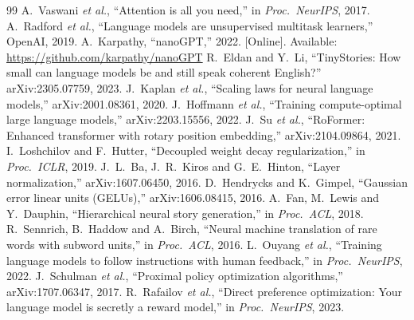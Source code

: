 \documentclass[10pt,twocolumn]{article}
\begin{document}
\begin{thebibliography}{99}\footnotesize
{}A.~Vaswani \emph{et al.}, ``Attention is all you need,'' in \emph{Proc.\ NeurIPS}, 2017.
A.~Radford \emph{et al.}, ``Language models are unsupervised multitask learners,'' OpenAI, 2019.
A.~Karpathy, ``nanoGPT,'' 2022. [Online]. Available: \url{https://github.com/karpathy/nanoGPT}
R.~Eldan and Y.~Li, ``TinyStories: How small can language models be and still speak coherent English?'' arXiv:2305.07759, 2023.
J.~Kaplan \emph{et al.}, ``Scaling laws for neural language models,'' arXiv:2001.08361, 2020.
J.~Hoffmann \emph{et al.}, ``Training compute-optimal large language models,'' arXiv:2203.15556, 2022.
J.~Su \emph{et al.}, ``RoFormer: Enhanced transformer with rotary position embedding,'' arXiv:2104.09864, 2021.
I.~Loshchilov and F.~Hutter, ``Decoupled weight decay regularization,'' in \emph{Proc.\ ICLR}, 2019.
J.~L.~Ba, J.~R.~Kiros and G.~E.~Hinton, ``Layer normalization,'' arXiv:1607.06450, 2016.
D.~Hendrycks and K.~Gimpel, ``Gaussian error linear units (GELUs),'' arXiv:1606.08415, 2016.
A.~Fan, M.~Lewis and Y.~Dauphin, ``Hierarchical neural story generation,'' in \emph{Proc.\ ACL}, 2018.
R.~Sennrich, B.~Haddow and A.~Birch, ``Neural machine translation of rare words with subword units,'' in \emph{Proc.\ ACL}, 2016.
L.~Ouyang \emph{et al.}, ``Training language models to follow instructions with human feedback,'' in \emph{Proc.\ NeurIPS}, 2022.
J.~Schulman \emph{et al.}, ``Proximal policy optimization algorithms,'' arXiv:1707.06347, 2017.
R.~Rafailov \emph{et al.}, ``Direct preference optimization: Your language model is secretly a reward model,'' in \emph{Proc.\ NeurIPS}, 2023.
\end{thebibliography}
\end{document}

